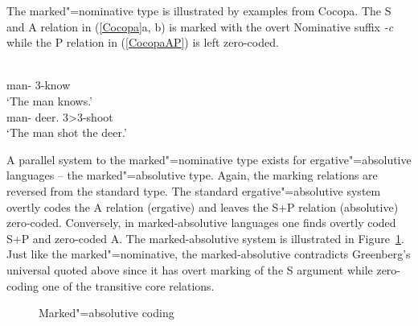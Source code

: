 The marked"=nominative type is illustrated by examples from Cocopa. 
The S and A relation in (\ref{Cocopa}a, b) is marked with the overt Nominative suffix \emph{-c} while the P relation in (\ref{CocopaAP}) is left zero-coded.

\begin{exe}\ex\label{Cocopa}
\begin{xlist}
\ex\label{CocopaS}\gll{} \\
man-{\nom{}} 3-know\\
`The man knows.'
\ex\label{CocopaAP}\gll {}  \\
man-{\nom{}} deer.{\acc{}} 3>3-shoot\\
`The man shot the deer.'
\end{xlist}
\end{exe} 

A parallel system to the marked"=nominative type exists for ergative"=absolutive languages -- the marked"=absolutive type. 
Again, the marking relations are reversed from the standard type. 
The standard ergative"=absolutive system overtly codes the A relation (ergative) and leaves the S+P relation (absolutive) zero-coded. 
Conversely, in marked-absolutive languages one finds overtly coded S+P and zero-coded A. The marked-absolutive system is illustrated in Figure~\ref{MA-align}. 
Just like the marked"=nominative, the marked-absolutive contradicts Greenberg's universal quoted above since it has overt marking of the S argument while zero-coding one of the transitive core relations. 

\begin{figure}[ht]
\centering
{}
\caption{Marked"=absolutive coding}\label{MA-align}
\end{figure}

